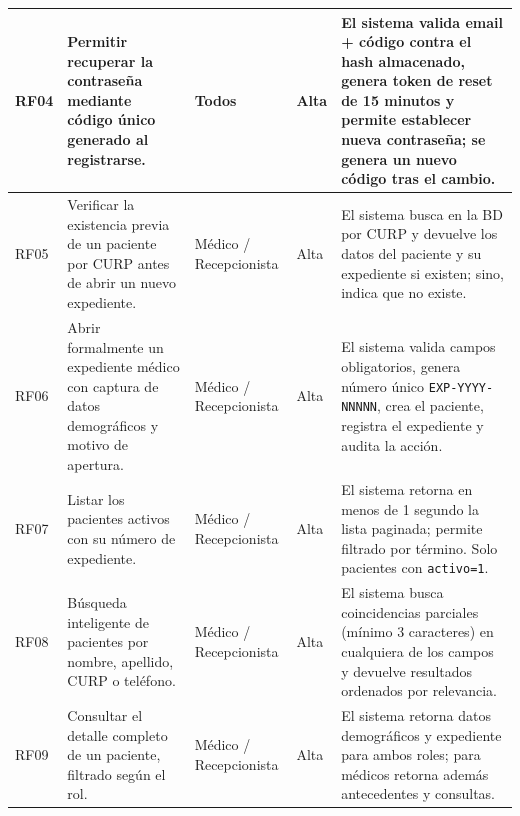 \documentclass[11pt,a4paper]{article}
\begin{document}
\begin{longtable}{|C{1cm}|L{5cm}|L{2.5cm}|C{1cm}|L{4cm}|}
    RF04        & Permitir recuperar la contraseña mediante código único generado al registrarse.                                        & Todos                          & Alta            & El sistema valida email + código contra el hash almacenado, genera token de reset de 15 minutos y permite establecer nueva contraseña; se genera un nuevo código tras el cambio.                                           \\
    \hline

    RF05        & Verificar la existencia previa de un paciente por CURP antes de abrir un nuevo expediente.                             & Médico / Recepcionista         & Alta            & El sistema busca en la BD por CURP y devuelve los datos del paciente y su expediente si existen; sino, indica que no existe.                                                                                               \\
    \hline

    RF06        & Abrir formalmente un expediente médico con captura de datos demográficos y motivo de apertura.                         & Médico / Recepcionista         & Alta            & El sistema valida campos obligatorios, genera número único \texttt{EXP-YYYY-NNNNN}, crea el paciente, registra el expediente y audita la acción.                                                                           \\
    \hline

    RF07        & Listar los pacientes activos con su número de expediente.                                                              & Médico / Recepcionista         & Alta            & El sistema retorna en menos de 1 segundo la lista paginada; permite filtrado por término. Solo pacientes con \texttt{activo=1}.                                                                                            \\
    \hline

    RF08        & Búsqueda inteligente de pacientes por nombre, apellido, CURP o teléfono.                                               & Médico / Recepcionista         & Alta            & El sistema busca coincidencias parciales (mínimo 3 caracteres) en cualquiera de los campos y devuelve resultados ordenados por relevancia.                                                                                 \\
    \hline

    RF09        & Consultar el detalle completo de un paciente, filtrado según el rol.                                                   & Médico / Recepcionista         & Alta            & El sistema retorna datos demográficos y expediente para ambos roles; para médicos retorna además antecedentes y consultas.                                                                                                 \\
    \hline


\end{longtable}
\end{document}
